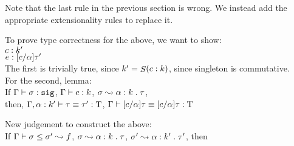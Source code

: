 Note that the last rule in the previous section is wrong.
We instead add the appropriate extensionality rules to replace it.
\begin{mathpar}
\end{mathpar}
To prove type correctness for the above, we want to show: \\
$c \of k'$ \\
$e \of \subst{c}{\alpha}{\tau'}$ \\

The first is trivially true, since $k' = \singleton{c \of k}$, since
singleton is commutative. \\

For the second, lemma: \\
If $\Gamma \vd \sigma \of \sig$, $\Gamma \vd c \of k$,
$\sigma \splitsto \bind{\alpha \of k}{\tau}$, \\
then, $\Gamma, \alpha \of k' \vd \tau \equiv \tau' \of \type$,
$\Gamma \vd \subst{c}{\alpha}{\tau} \equiv \subst{c}{\alpha}{\tau} \of \type$

\begin{mathpar}
\end{mathpar}

\begin{mathpar}
\end{mathpar}
New judgement to construct the above: \\
If $\Gamma \vd \sigma \le \sigma' \splitsto f$,
$\sigma \splitsto \bind{\alpha \of k}{\tau}$,
$\sigma' \splitsto \bind{\alpha \of k'}{\tau'}$,
then %

